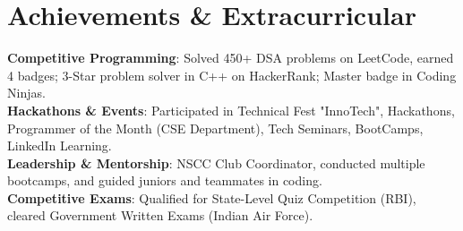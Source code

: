 \documentclass[letterpaper,11pt]{article}
\newcommand{\resumeSubHeadingListStart}{\begin{itemize}[leftmargin=0.0in, label={}]}
\newcommand{\resumeSubHeadingListEnd}{\end{itemize}}
\begin{document}

\section{Achievements \& Extracurricular}
\begin{itemize}[leftmargin=0.15in, label={}]
    \small{\item{
        \textbf{Competitive Programming}{: Solved 450+ DSA problems on LeetCode, earned 4 badges; 3-Star problem solver in C++ on HackerRank; Master badge in Coding Ninjas.} \\  
        \textbf{Hackathons \& Events}{: Participated in Technical Fest "InnoTech", Hackathons, Programmer of the Month (CSE Department), Tech Seminars, BootCamps, LinkedIn Learning.} \\  
        \textbf{Leadership \& Mentorship}{: NSCC Club Coordinator, conducted multiple bootcamps, and guided juniors and teammates in coding.} \\  
        \textbf{Competitive Exams}{: Qualified for State-Level Quiz Competition (RBI), cleared Government Written Exams (Indian Air Force).} \\  
    }}
\end{itemize}
\vspace{-16pt}
\end{document}
